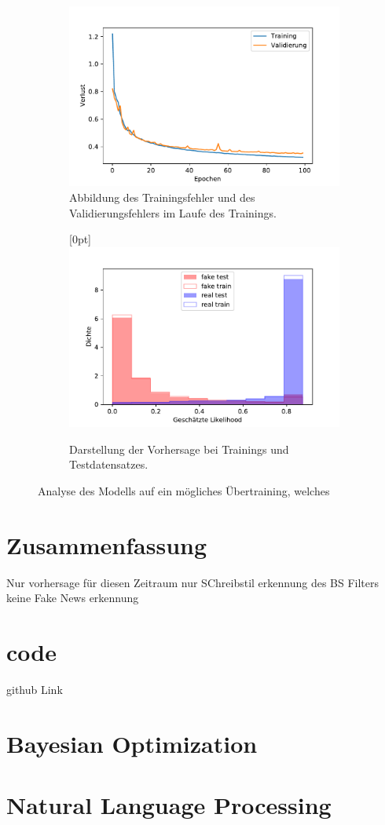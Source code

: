 \begin{figure}[t!]
    \centering
    \begin{subfigure}[t]{0.49\textwidth}
        \centering
        \includegraphics[width=\textwidth]{pictures/history_bow_best.pdf}
        \caption{Abbildung des Trainingsfehler und des Validierungsfehlers im Laufe des Trainings.}
        \label{fig:history}
    \end{subfigure}
    \begin{subfigure}[t]{0.49\textwidth}
        \centering
        \raisebox{1.5cm}[0pt]{\includegraphics[width=\textwidth]{pictures/prob_bow_best_nn.pdf}}
        \caption{Darstellung der Vorhersage bei Trainings und Testdatensatzes.}
        \label{fig:probs}
    \end{subfigure}
    \caption{Analyse des Modells auf ein mögliches Übertraining, welches }
    \end{figure}

\chapter{Zusammenfassung}
Nur vorhersage für diesen Zeitraum
nur SChreibstil erkennung des BS Filters keine Fake News erkennung 


\chapter{code}
github Link

\appendix
\chapter{Bayesian Optimization}
\chapter{Natural Language Processing}
